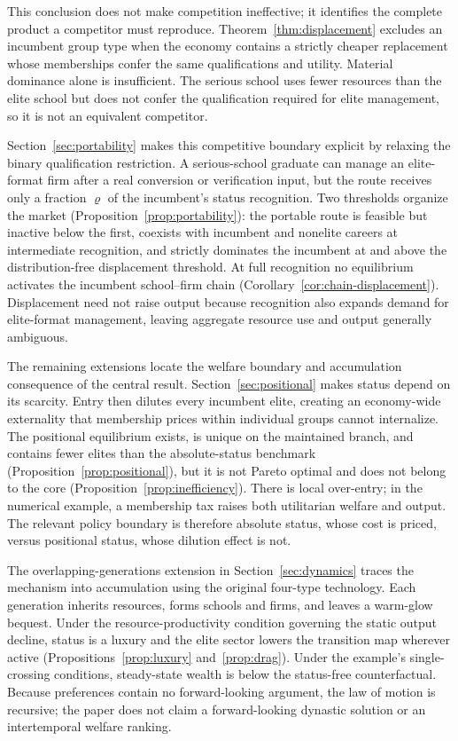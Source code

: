 \documentclass[12pt,letterpaper]{article}
\theoremstyle{definition}
\begin{document}
This conclusion does not make competition ineffective; it identifies the complete
product a competitor must reproduce.
Theorem~\ref{thm:displacement} excludes an incumbent group type when the economy contains
a strictly cheaper replacement whose memberships confer the same qualifications and
utility.
Material dominance alone is insufficient.
The serious school uses fewer resources than the elite school but does not confer the
qualification required for elite management, so it is not an equivalent competitor.

Section~\ref{sec:portability} makes this competitive boundary explicit by relaxing the
binary qualification restriction.
A serious-school graduate can manage an elite-format firm after a real conversion or
verification input, but the route receives only a fraction $\varrho$ of the incumbent's
status recognition.
Two thresholds organize the market (Proposition~\ref{prop:portability}): the portable
route is feasible but inactive below the first, coexists with incumbent and nonelite
careers at intermediate recognition, and strictly dominates the incumbent at and above
the distribution-free displacement threshold.
At full recognition no equilibrium activates the incumbent school--firm chain
(Corollary~\ref{cor:chain-displacement}).
Displacement need not raise output because recognition also expands demand for
elite-format management, leaving aggregate resource use and output generally ambiguous.

The remaining extensions locate the welfare boundary and accumulation consequence of the
central result.
Section~\ref{sec:positional} makes status depend on its scarcity.
Entry then dilutes every incumbent elite, creating an economy-wide externality that
membership prices within individual groups cannot internalize.
The positional equilibrium exists, is unique on the maintained branch, and contains fewer
elites than the absolute-status benchmark (Proposition~\ref{prop:positional}), but it is
not Pareto optimal and does not belong to the core
(Proposition~\ref{prop:inefficiency}).
There is local over-entry; in the numerical example, a membership tax raises both
utilitarian welfare and output.
The relevant policy boundary is therefore absolute status, whose cost is priced, versus
positional status, whose dilution effect is not.

The overlapping-generations extension in Section~\ref{sec:dynamics} traces the mechanism
into accumulation using the original four-type technology.
Each generation inherits resources, forms schools and firms, and leaves a warm-glow
bequest.
Under the resource-productivity condition governing the static output decline, status is
a luxury and the elite sector lowers the transition map wherever active
(Propositions~\ref{prop:luxury} and~\ref{prop:drag}).
Under the example's single-crossing conditions, steady-state wealth is below the
status-free counterfactual.
Because preferences contain no forward-looking argument, the law of motion is recursive;
the paper does not claim a forward-looking dynastic solution or an intertemporal welfare
ranking.
\end{document}
